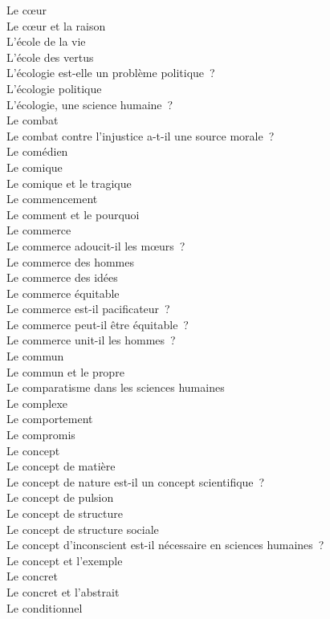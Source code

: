 \documentclass[a4paper,12pt]{article}
\begin{document}
Le cœur \\
Le cœur et la raison \\
L'école de la vie \\
L'école des vertus \\
L'écologie est-elle un problème politique ? \\
L'écologie politique \\
L'écologie, une science humaine ? \\
Le combat \\
Le combat contre l'injustice a-t-il une source morale ? \\
Le comédien \\
Le comique \\
Le comique et le tragique \\
Le commencement \\
Le comment et le pourquoi \\
Le commerce \\
Le commerce adoucit-il les mœurs ? \\
Le commerce des hommes \\
Le commerce des idées \\
Le commerce équitable \\
Le commerce est-il pacificateur ? \\
Le commerce peut-il être équitable ? \\
Le commerce unit-il les hommes ? \\
Le commun \\
Le commun et le propre \\
Le comparatisme dans les sciences humaines \\
Le complexe \\
Le comportement \\
Le compromis \\
Le concept \\
Le concept de matière \\
Le concept de nature est-il un concept scientifique ? \\
Le concept de pulsion \\
Le concept de structure \\
Le concept de structure sociale \\
Le concept d'inconscient est-il nécessaire en sciences humaines ? \\
Le concept et l'exemple \\
Le concret \\
Le concret et l'abstrait \\
Le conditionnel \\
\end{document}
